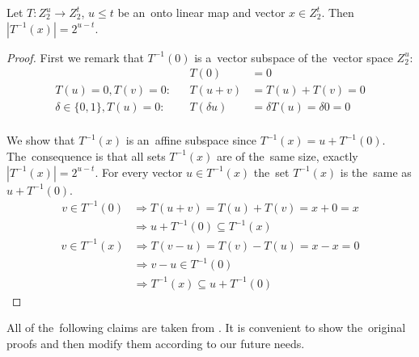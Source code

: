 \begin{lemma}
\label{lemma-linear-transformation-domain-distribution}
Let $T: Z_2^u \rightarrow Z_2^t$, $u \leq t$ be an~onto linear map and vector $x \in Z_2^t$. Then $|T^{-1}(x)| = 2 ^ {u-t}$.
\end{lemma}
\begin{proof}
First we remark that $T^{-1}(0)$ is a~vector subspace of the~vector space $Z_2^u$:
\begin{align*}
&\textit{}& T(0) & = 0 \\
T(u) = 0, T(v) = 0: &\textit{}& T(u + v) & = T(u) + T(v) = 0 \\
\delta \in \lbrace 0, 1 \rbrace, T(u) = 0: &\textit{}& T(\delta u) & = \delta T(u) = \delta 0 = 0 \\
\end{align*}

We show that $T^{-1}(x)$ is an~affine subspace since $T^{-1}(x) = u + T^{-1}(0)$. The~consequence is that all sets $T^{-1}(x)$ are of the~same size, exactly $|T^{-1}(x)| = 2^{u-t}$. For every vector $u \in T^{-1}(x)$ the~set $T^{-1}(x)$ is the~same as $u + T^{-1}(0)$.
\begin{displaymath}
\begin{split}
v \in T^{-1}(0) 
	& \Rightarrow T(u+v) = T(u) + T(v) = x + 0 = x  \\
	& \Rightarrow u + T^{-1}(0) \subseteq T^{-1}(x)
\end{split}
\end{displaymath}
\begin{displaymath}
\begin{split}
v \in T^{-1}(x) 
	& \Rightarrow T(v-u) = T(v) - T(u) = x - x = 0 \\
	& \Rightarrow v - u \in T^{-1}(0) \\
	& \Rightarrow T^{-1}(x) \subseteq u + T^{-1}(0)
\end{split}
\end{displaymath}
\end{proof}

All of the~following claims are taken from \cite{linear-hash-functions}. It is convenient to show the~original proofs and then modify them according to our future needs.

